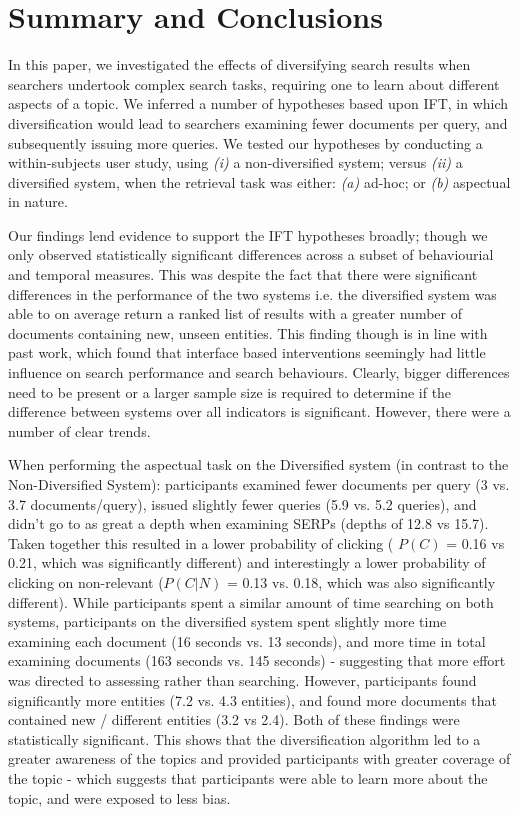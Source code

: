 \section{Summary and Conclusions} \label{sec:conclusion}

In this paper, we investigated the effects of diversifying search results when searchers undertook complex search tasks, requiring one to learn about different aspects of a topic. We inferred a number of hypotheses based upon IFT, in which diversification would lead to searchers examining fewer documents per query, and subsequently issuing more queries. We tested our hypotheses by conducting a within-subjects user study, using \emph{(i)} a non-diversified system; versus \emph{(ii)} a diversified system, when the retrieval task was either: \emph{(a)} ad-hoc; or \emph{(b)} aspectual in nature.

Our findings lend evidence to support the IFT hypotheses broadly; though we only observed statistically significant differences across a subset of behaviourial and temporal measures. This was despite the fact that there were significant differences in the performance of the two systems i.e. the diversified system was able to on average return a ranked list of results with a greater number of documents containing new, unseen entities. This finding though is in line with past work, which found that interface based interventions seemingly had little influence on search performance and search behaviours. Clearly, bigger differences  need to be present  or a larger sample size is required to determine if the difference between systems over all indicators is significant. However, there were a number of clear trends.

When performing the aspectual task on the Diversified system (in contrast to the Non-Diversified System):  participants examined fewer documents per query (3 vs. 3.7 documents/query), issued slightly fewer queries (5.9 vs. 5.2 queries), and didn't go to as great a depth when examining SERPs (depths of 12.8 vs 15.7). Taken together this resulted in a lower probability of clicking ( $P(C)$ = 0.16 vs 0.21, which was significantly different) and interestingly a lower probability of clicking on non-relevant ($P(C|N)$ = 0.13 vs. 0.18, which was also significantly different). While participants spent a similar amount of time searching on both systems, participants on the diversified system spent slightly more time examining each document (16 seconds vs. 13 seconds), and more time in total examining documents (163 seconds vs. 145 seconds) - suggesting that more effort was directed to assessing rather than searching. However, participants found significantly more entities (7.2 vs. 4.3 entities), and found more documents that contained new / different entities (3.2 vs 2.4). Both of these findings were statistically significant. This shows that the diversification algorithm led to a greater awareness of the topics and provided participants with greater coverage of the topic - which suggests that participants were able to learn more about the topic, and were exposed to less bias.

